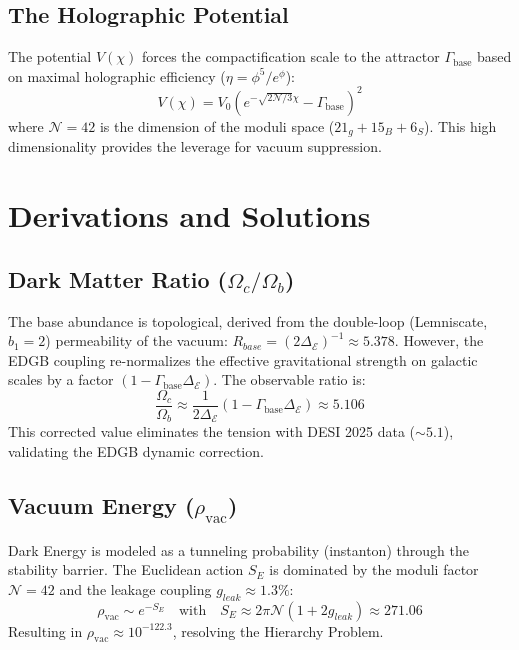 \documentclass[aps,prd,twocolumn,superscriptaddress,showpacs,amsmath,amssymb,floatfix,nofootinbib]{revtex4-2}
\newcommand{\Gap}{\Delta_{\mathcal{E}}}
\newcommand{\Tension}{\Gamma_{\mathrm{base}}}
\begin{document}
\subsection{The Holographic Potential}
The potential $V(\chi)$ forces the compactification scale to the attractor $\Tension$ based on maximal holographic efficiency ($\eta = \phi^5/e^\phi$):
\begin{equation}
V(\chi) = V_0 \left( e^{-\sqrt{2\mathcal{N}/3}\chi} - \Tension \right)^2
\end{equation}
where $\mathcal{N}=42$ is the dimension of the moduli space ($21_{g}+15_{B}+6_{S}$). This high dimensionality provides the leverage for vacuum suppression.

\section{Derivations and Solutions}

\subsection{Dark Matter Ratio ($\Omega_c/\Omega_b$)}
The base abundance is topological, derived from the double-loop (Lemniscate, $b_1=2$) permeability of the vacuum: $R_{base} = (2\Gap)^{-1} \approx 5.378$.
However, the EDGB coupling re-normalizes the effective gravitational strength on galactic scales by a factor $(1 - \Tension\Gap)$. The observable ratio is:
\begin{equation}
\frac{\Omega_c}{\Omega_b} \approx \frac{1}{2\Gap} (1 - \Tension\Gap) \approx 5.106
\end{equation}
This corrected value eliminates the tension with DESI 2025 data ($\sim 5.1$), validating the EDGB dynamic correction.

\subsection{Vacuum Energy ($\rho_{\mathrm{vac}}$)}
Dark Energy is modeled as a tunneling probability (instanton) through the stability barrier. The Euclidean action $S_E$ is dominated by the moduli factor $\mathcal{N}=42$ and the leakage coupling $g_{leak} \approx 1.3\%$:
\begin{equation}
\rho_{\mathrm{vac}} \sim e^{-S_E} \quad \text{with} \quad S_E \approx 2\pi \mathcal{N} (1 + 2 g_{leak}) \approx 271.06
\end{equation}
Resulting in $\rho_{\mathrm{vac}} \approx 10^{-122.3}$, resolving the Hierarchy Problem.
\end{document}
